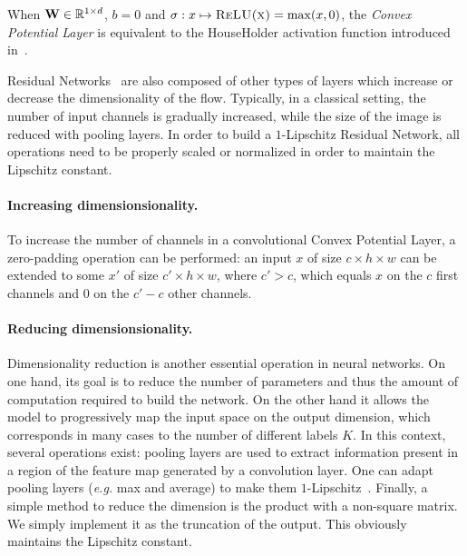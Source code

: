 \begin{rmq}
When $\mathbf{W}\in\mathbb{R}^{1\times d}$, $b =0$ and $\sigma:x\mapsto\textsc{ReLU(x)}= \max(x,0)$, the \emph{Convex Potential Layer} is equivalent to the HouseHolder activation function introduced in~\citet{singla2021householder}.
\end{rmq}

Residual Networks~\citep{he2016deep} are also composed of other types of layers which increase or decrease the dimensionality of the flow.
Typically, in a classical setting, the number of input channels is gradually increased, while the size of the image is reduced with pooling layers.
In order to build a $1$-Lipschitz Residual Network, all operations need to be properly scaled or normalized in order to maintain the Lipschitz constant.

\paragraph{Increasing dimensionsionality.} To increase the number of channels in a convolutional Convex Potential Layer, a zero-padding operation can be performed: an input $x$ of size $c\times h \times w$ can be extended to some $x'$ of size  $c'\times h \times w$, where $c'>c$, which equals $x$ on the $c$ first channels and $0$ on the $c'-c$ other channels.
\paragraph{Reducing dimensionsionality.} Dimensionality reduction is another essential operation in neural networks. On one hand, its  goal is to  reduce the number of parameters and thus the amount of computation required to build the network. On the other hand it allows the model to progressively map the input space on the output dimension, which corresponds in many cases to the number of different labels $K$. 
In this context, several operations exist:
pooling layers are used to extract information present in a region of the feature map generated by a convolution layer. One can adapt pooling layers (\emph{e.g.} max and average) to make them $1$-Lipschitz~\citep{bartlett2017spectrally}.
Finally, a simple method to reduce the dimension is the product with a non-square matrix. We simply implement it as  the truncation of the output. This obviously maintains the Lipschitz constant.


